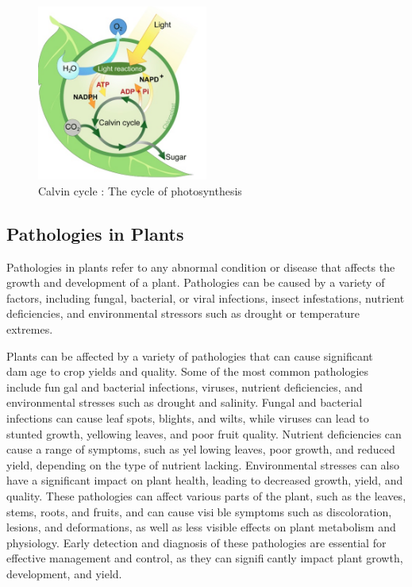 \documentclass{article}
\begin{document}
{            \begin{figure}[h]
                \centering
                \includegraphics[width=0.5\textwidth]{Figures/CalvinCycle.PNG}
                \caption{Calvin cycle :  The cycle of photosynthesis}
                \label{fig:my_label}
            \end{figure}
            \newpage
            
            \subsection{Pathologies in Plants}
            \hspace{0.5cm}Pathologies in plants refer to any abnormal condition or disease that affects the growth and development of a plant. Pathologies can be caused by a variety of factors, including fungal, bacterial, or viral infections, insect infestations, nutrient deficiencies, and environmental stressors such as drought or temperature extremes.\par
            Plants can be affected by a variety of pathologies that can cause significant damage to crop yields and quality. Some of the most common pathologies include fungal and bacterial infections, viruses, nutrient deficiencies, and environmental stresses such as drought and salinity. Fungal and bacterial infections can cause leaf spots, blights, and wilts, while viruses can lead to stunted growth, yellowing leaves, and poor fruit quality. Nutrient deficiencies can cause a range of symptoms, such as yellowing leaves, poor growth, and reduced yield, depending on the type of nutrient lacking. Environmental stresses can also have a significant impact on plant health, leading to decreased growth, yield, and quality. These pathologies can affect various parts of the plant, such as the leaves, stems, roots, and fruits, and can cause visible symptoms such as discoloration, lesions, and deformations, as well as less visible effects on plant metabolism and physiology. Early detection and diagnosis of these pathologies are essential for effective management and control, as they can significantly impact plant growth, development, and yield.
}
\end{document}
